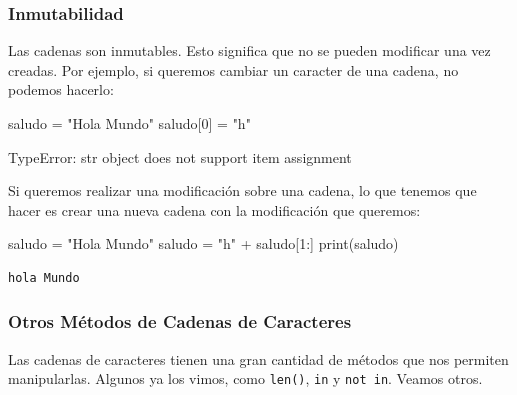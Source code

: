 \documentclass[
  letterpaper,
  DIV=11,
  numbers=noendperiod]{scrreprt}
\newenvironment{Shaded}{\begin{snugshade}}{\end{snugshade}}
\newcommand{\BuiltInTok}[1]{\textcolor[rgb]{0.00,0.23,0.31}{#1}}
\newcommand{\DecValTok}[1]{\textcolor[rgb]{0.68,0.00,0.00}{#1}}
\newcommand{\NormalTok}[1]{\textcolor[rgb]{0.00,0.23,0.31}{#1}}
\newcommand{\OperatorTok}[1]{\textcolor[rgb]{0.37,0.37,0.37}{#1}}
\newcommand{\StringTok}[1]{\textcolor[rgb]{0.13,0.47,0.30}{#1}}
\begin{document}
\subsubsection{Inmutabilidad}\label{inmutabilidad}

Las cadenas son inmutables. Esto significa que no se pueden modificar
una vez creadas. Por ejemplo, si queremos cambiar un caracter de una
cadena, no podemos hacerlo:

\begin{Shaded}
\begin{Highlighting}[]
\NormalTok{saludo }\OperatorTok{=} \StringTok{"Hola Mundo"}
\NormalTok{saludo[}\DecValTok{0}\NormalTok{] }\OperatorTok{=} \StringTok{"h"}
\end{Highlighting}
\end{Shaded}

\begin{Shaded}
\begin{Highlighting}[]
\NormalTok{TypeError: \textquotesingle{}str\textquotesingle{} object does not support item assignment}
\end{Highlighting}
\end{Shaded}

Si queremos realizar una modificación sobre una cadena, lo que tenemos
que hacer es crear una nueva cadena con la modificación que queremos:

\begin{Shaded}
\begin{Highlighting}[]
\NormalTok{saludo }\OperatorTok{=} \StringTok{"Hola Mundo"}
\NormalTok{saludo }\OperatorTok{=} \StringTok{"h"} \OperatorTok{+}\NormalTok{ saludo[}\DecValTok{1}\NormalTok{:]}
\BuiltInTok{print}\NormalTok{(saludo)}
\end{Highlighting}
\end{Shaded}

\begin{verbatim}
hola Mundo
\end{verbatim}

\subsubsection{Otros Métodos de Cadenas de
Caracteres}\label{otros-muxe9todos-de-cadenas-de-caracteres}

Las cadenas de caracteres tienen una gran cantidad de métodos que nos
permiten manipularlas. Algunos ya los vimos, como \texttt{len()},
\texttt{in} y \texttt{not\ in}. Veamos otros.
\end{document}
